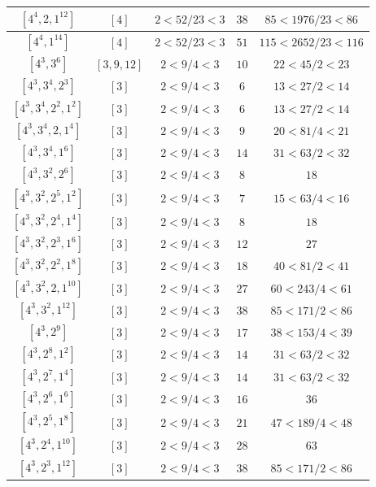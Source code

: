 \documentclass{article}%
\begin{document}
\begin{center}
\begin{longtable}{||c|c|c|c|c||}
$[4^{4}, 2, 1^{12}]$ & $[4]$ & $2 < 52/23 < 3$ & $38$ & $85 < 1976/23 < 86$ \\ \hline 
$[4^{4}, 1^{14}]$ & $[4]$ & $2 < 52/23 < 3$ & $51$ & $115 < 2652/23 < 116$ \\ \hline 
$[4^{3}, 3^{6}]$ & $[3, 9, 12]$ & $2 < 9/4 < 3$ & $10$ & $22 < 45/2 < 23$ \\ \hline 
$[4^{3}, 3^{4}, 2^{3}]$ & $[3]$ & $2 < 9/4 < 3$ & $6$ & $13 < 27/2 < 14$ \\ \hline 
$[4^{3}, 3^{4}, 2^{2}, 1^{2}]$ & $[3]$ & $2 < 9/4 < 3$ & $6$ & $13 < 27/2 < 14$ \\ \hline 
$[4^{3}, 3^{4}, 2, 1^{4}]$ & $[3]$ & $2 < 9/4 < 3$ & $9$ & $20 < 81/4 < 21$ \\ \hline 
$[4^{3}, 3^{4}, 1^{6}]$ & $[3]$ & $2 < 9/4 < 3$ & $14$ & $31 < 63/2 < 32$ \\ \hline 
$[4^{3}, 3^{2}, 2^{6}]$ & $[3]$ & $2 < 9/4 < 3$ & $8$ & $18$ \\ \hline 
$[4^{3}, 3^{2}, 2^{5}, 1^{2}]$ & $[3]$ & $2 < 9/4 < 3$ & $7$ & $15 < 63/4 < 16$ \\ \hline 
$[4^{3}, 3^{2}, 2^{4}, 1^{4}]$ & $[3]$ & $2 < 9/4 < 3$ & $8$ & $18$ \\ \hline 
$[4^{3}, 3^{2}, 2^{3}, 1^{6}]$ & $[3]$ & $2 < 9/4 < 3$ & $12$ & $27$ \\ \hline 
$[4^{3}, 3^{2}, 2^{2}, 1^{8}]$ & $[3]$ & $2 < 9/4 < 3$ & $18$ & $40 < 81/2 < 41$ \\ \hline 
$[4^{3}, 3^{2}, 2, 1^{10}]$ & $[3]$ & $2 < 9/4 < 3$ & $27$ & $60 < 243/4 < 61$ \\ \hline 
$[4^{3}, 3^{2}, 1^{12}]$ & $[3]$ & $2 < 9/4 < 3$ & $38$ & $85 < 171/2 < 86$ \\ \hline 
$[4^{3}, 2^{9}]$ & $[3]$ & $2 < 9/4 < 3$ & $17$ & $38 < 153/4 < 39$ \\ \hline 
$[4^{3}, 2^{8}, 1^{2}]$ & $[3]$ & $2 < 9/4 < 3$ & $14$ & $31 < 63/2 < 32$ \\ \hline 
$[4^{3}, 2^{7}, 1^{4}]$ & $[3]$ & $2 < 9/4 < 3$ & $14$ & $31 < 63/2 < 32$ \\ \hline 
$[4^{3}, 2^{6}, 1^{6}]$ & $[3]$ & $2 < 9/4 < 3$ & $16$ & $36$ \\ \hline 
$[4^{3}, 2^{5}, 1^{8}]$ & $[3]$ & $2 < 9/4 < 3$ & $21$ & $47 < 189/4 < 48$ \\ \hline 
$[4^{3}, 2^{4}, 1^{10}]$ & $[3]$ & $2 < 9/4 < 3$ & $28$ & $63$ \\ \hline 
$[4^{3}, 2^{3}, 1^{12}]$ & $[3]$ & $2 < 9/4 < 3$ & $38$ & $85 < 171/2 < 86$ \\ \hline 

\end{longtable}
\end{center}
\end{document}
